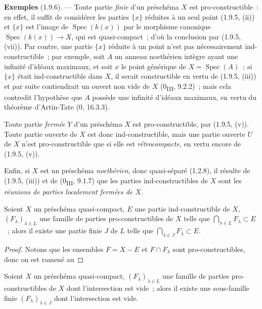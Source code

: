 \begin{env}[1.9.6]
\label{IV.1.9.6-fr}
\textbf{Exemples} (1.9.6). --- Toute partie \emph{finie} d'un préschéma $X$
est pro-constructible~: en effet, il suffit de considérer les parties
$\{x\}$ réduites à un seul point (1.9.5, (ii)) et $\{x\}$ est l'image de
$\operatorname{Spec}(k(x))$ par le morphisme canonique
$\operatorname{Spec}(k(x))\to X$, qui est quasi-compact~; d'où la conclusion
par (1.9.5, (vii)). Par contre, une partie $\{x\}$ réduite à un point n'est
pas nécessairement ind-constructible~; par exemple, soit $A$ un anneau
noethérien intègre ayant une infinité d'idéaux maximaux, et soit $x$ le point
générique de $X=\operatorname{Spec}(A)$~; si $\{x\}$ était ind-constructible
dans $X$, il serait constructible en vertu de (1.9.5, (iii)) et par suite
contiendrait un ouvert non vide de $X$ (0\textsubscript{III}, 9.2.2)~; mais
cela contredit l'hypothèse que $A$ possède une infinité d'idéaux maximaux, en
vertu du théorème d'Artin-Tate (0, 16.3.3).

Toute partie \emph{fermée} $Y$ d'un préschéma $X$ est pro-constructible, par
(1.9.5, (v)). Toute partie ouverte de $X$ est donc ind-constructible, mais
une partie ouverte $U$ de $X$ n'est pro-constructible que si elle est
\emph{rétrocompacte}, en vertu encore de (1.9.5, (v)).

Enfin, si $X$ est un préschéma \emph{noethérien}, donc quasi-séparé (1.2.8),
il résulte de (1.9.5, (iii)) et de (0\textsubscript{III}, 9.1.7) que les
parties ind-constructibles de $X$ sont les \emph{réunions de parties
localement fermées de $X$}.
\end{env}

\begin{theorem}[1.9.7]
\label{IV.1.9.7-fr}
Soient $X$ un préschéma quasi-compact, $E$ une partie ind-constructible de
$X$, $(F_\lambda)_{\lambda\in L}$ une famille de parties pro-constructibles
de $X$ telle que $\bigcap_{\lambda\in L}F_\lambda\subset E$~; alors il existe
une partie finie $J$ de $L$ telle que
$\bigcap_{\lambda\in J}F_\lambda\subset E$.
\end{theorem}

\begin{proof}
Notons que les ensembles $F=X-E$ et $F\cap F_\lambda$ sont
pro-constructibles, donc on est ramené au
\end{proof}

\begin{corollary}[1.9.8]
\label{IV.1.9.8-fr}
Soient $X$ un préschéma quasi-compact, $(F_\lambda)_{\lambda\in L}$ une
famille de parties pro-constructibles de $X$ dont l'intersection est vide~;
alors il existe une sous-famille finie $(F_\lambda)_{\lambda\in J}$ dont
l'intersection est vide.
\end{corollary}

